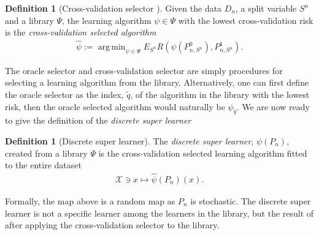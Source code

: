 \documentclass[11pt, a4paper]{article}
\DeclareMathOperator*{\argmin}{arg\,min}
\theoremstyle{definition}
\newtheorem{definition}[theorem]{Definition}
\theoremstyle{remark}
\newcommand{\q}{q}
\newcommand{\btheta}{\theta}
\newcommand{\la}{\psi}
\newcommand{\Sn}{S^n}
\newcommand{\lib}{\Psi}
\begin{document}
\begin{definition}[Cross-validation selector \parencite{laan03}] \label{def:cvselector}
    Given the data $ D_n $, a split variable $ \Sn $ and a library $ \lib $, the learning algorithm $ \la \in \lib $ with the lowest cross-validation risk is the \textit{cross-validation selected algorithm}
    \begin{align*}
        \hat{\la} := \argmin_{\la \in \lib} E_{\Sn} R(\la(P_{n,\Sn}^0 ) , P_{n, \Sn}^{1}).
    \end{align*}
\end{definition}
%
The oracle selector and cross-validation selector are simply procedures for selecting a learning algorithm from the library. Alternatively, one can first define the oracle selector as the index, $ \tilde{\q} $, of the algorithm in the library with the lowest risk, then the oracle selected algorithm would naturally be $ \la_{ \tilde{\q} } $. We are now ready to give the definition of the \textit{discrete super learner}  
\begin{definition}[Discrete super learner]
    The \textit{discrete super learner}, $ \la(P_n) $, created from a library $ \lib $ is the cross-validation selected learning algorithm fitted to the entire dataset 
    \begin{align*}
        \mathcal{X} \ni x \mapsto \hat{\la}(P_n)(x). 
    \end{align*}
\end{definition}
Formally, the map above is a random map as $ P_n $ is stochastic. The discrete super learner is not a specific learner among the learners in the library, but the result of after applying the cross-validation selector to the library. 
\end{document}

